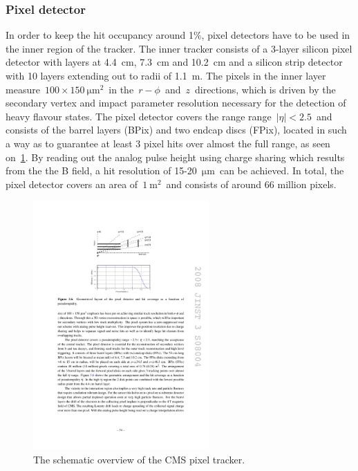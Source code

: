 \subsubsection{Pixel detector}
In order to keep the hit occupancy around 1\%, pixel detectors have to be used in the inner region of the tracker. The inner tracker consists of a 3-layer silicon pixel detector with layers at 4.4~cm, 7.3~cm and 10.2~cm and a silicon strip detector with 10 layers extending out to radii of 1.1~m. The pixels in the inner layer measure~$100\times150~\mathrm{\mu m}^2$~in the~$r-\phi$~and~$z$~directions, which is driven by the secondary vertex and impact parameter resolution necessary for the detection of heavy flavour states. The pixel detector covers the range range~$|\eta| < 2.5$~and consists of the barrel layers (BPix) and two endcap discs (FPix), located in such a way as to guarantee at least 3 pixel hits over almost the full range, as seen on~\cref{fig:cms_pixel}. By reading out the analog pulse height using charge sharing which results from the the B field, a hit resolution of 15-20~$\mathrm{\mu m}$~can be achieved. In total, the pixel detector covers an area of~$1~\mathrm{m}^2$~and consists of around 66 million pixels.

\begin{figure}
\begin{centering}
\includegraphics[width=0.6\textwidth]{figures/exp/pixel.pdf}
\caption{The schematic overview of the CMS pixel tracker.}
\label{fig:cms_pixel}
\end{centering}
\end{figure}

